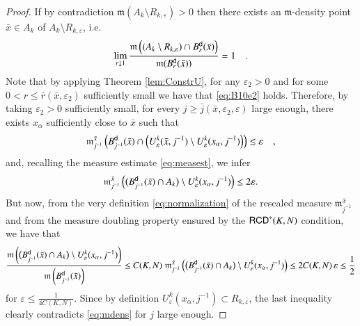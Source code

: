 \documentclass[11pt,reqno]{amsart}
\newcommand{\mm}{\mathfrak m}
\newcommand{\sfd}{{\sf d}}
\newcommand{\RCD}{{\sf RCD}}
\newcommand{\vare}{\varepsilon}
\theoremstyle{definition}
\theoremstyle{remark}
\theoremstyle{remark}
\theoremstyle{remark}
\theoremstyle{remark}
\theoremstyle{remark}
\theoremstyle{remark}
\theoremstyle{remark}
\begin{document}
\begin{proof}
If by contradiction $\mm(A_k\setminus R_{k,\vare})>0$ then there exists an $\mm$-density point $\bar{x}\in A_k$ of   $A_k\setminus R_{k,\vare}$, i.e.
\begin{equation} \label{eq:mdens}
\lim_{r\downarrow 1} \frac{\mm\left((A_k\setminus R_{k,\vare}) \cap B^{\sfd}_r(\bar{x})  \right)}{\mm(B^{\sfd}_r(\bar{x}))}=1 \quad. 
\end{equation}
Note that by applying  Theorem  \ref{lem:ConstrU},   for any $\vare_2>0$ and for some $0<r\leq \bar{r}(\bar{x},\vare_2)$ sufficiently small we have  that \eqref{eq:B10e2} holds. Therefore, by taking $\vare_2>0$ sufficiently small, for every $j\geq \bar{j}(\bar{x},\vare_2, \vare)$ large enough, there exists $x_\alpha$  sufficiently close to $\bar x$ such that 
$$\mm^{\bar{x}}_{j^{-1}}\left(B^{\sfd}_{j^{-1}}(\bar{x})\cap \Big(U^k_{\vare}(\bar{x},j^{-1})\setminus U^k_{\vare}(x_{\alpha},j^{-1}) \Big)\right)\leq \vare \quad,$$
and, recalling the measure estimate \eqref{eq:measest}, we infer 
$$
\mm^{\bar{x}}_{j^{-1}}\left(\big(B^{\sfd}_{j^{-1}}(\bar{x})\cap  A_k\big) \setminus U^k_{\vare}(x_{\alpha},j^{-1}) \right)\leq 2 \vare.
$$
But now, from the very definition \eqref{eq:normalization}  of the rescaled measure $\mm^{\bar{x}}_{j^{-1}}$ and from  the measure  doubling property ensured  by the $\RCD^*(K,N)$ condition, we have that
$$\frac{ \mm \left(\big(B^{\sfd}_{j^{-1}}(\bar{x})\cap  A_k\big) \setminus U^k_{\vare}(x_{\alpha},j^{-1}) \right)}{\mm\left(B_{j^{-1}}^{\sfd}(\bar{x})\right)}\leq C(K,N) \; \mm^{\bar{x}}_{j^{-1}}\left(\big(B^{\sfd}_{j^{-1}}(\bar{x})\cap  A_k\big) \setminus U^k_{\vare}(x_{\alpha},j^{-1}) \right) \leq 2 C(K,N)  \, \vare \leq \frac{1}{2}$$
for  $\vare \leq \frac{1}{4C(K,N)}$. Since by definition $U^k_{\vare}(x_{\alpha},j^{-1}) \subset R_{k, \vare}$, the last inequality clearly contradicts \eqref{eq:mdens} for $j$ large enough. 
\end{proof}
\end{document}
